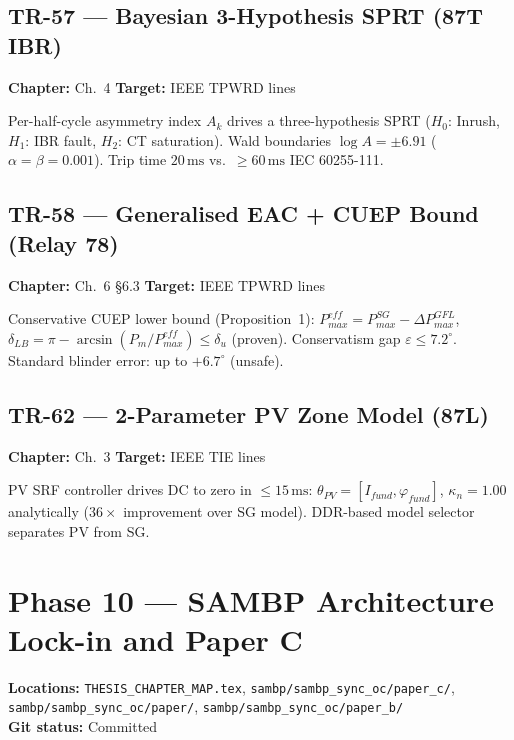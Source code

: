 \documentclass[11pt,a4paper]{article}
\begin{document}
\subsection{TR-57 — Bayesian 3-Hypothesis SPRT (87T IBR)}
\textbf{Chapter:} Ch.\ 4 \quad \textbf{Target:} IEEE TPWRD  lines

Per-half-cycle asymmetry index $A_k$ drives a three-hypothesis SPRT
($H_0$: Inrush, $H_1$: IBR fault, $H_2$: CT saturation).
Wald boundaries $\log A = \pm 6.91$ ($\alpha = \beta = 0.001$).
Trip time $20\,\mathrm{ms}$ vs.\ $\geq 60\,\mathrm{ms}$ IEC 60255-111.

\subsection{TR-58 — Generalised EAC + CUEP Bound (Relay 78)}
\textbf{Chapter:} Ch.\ 6 \S6.3 \quad \textbf{Target:} IEEE TPWRD  lines

Conservative CUEP lower bound (Proposition~1):
$P_{max}^{eff} = P_{max}^{SG} - \Delta P_{max}^{GFL}$,
$\delta_{LB} = \pi - \arcsin(P_m/P_{max}^{eff}) \leq \delta_u$ (proven).
Conservatism gap $\varepsilon \leq 7.2^\circ$. Standard blinder error:
up to $+6.7^\circ$ (unsafe).

\subsection{TR-62 — 2-Parameter PV Zone Model (87L)}
\textbf{Chapter:} Ch.\ 3 \quad \textbf{Target:} IEEE TIE  lines

PV SRF controller drives DC to zero in $\leq 15\,\mathrm{ms}$:
$\theta_{PV} = [I_{fund}, \varphi_{fund}]$,
$\kappa_n = 1.00$ analytically ($36\times$ improvement over SG model).
DDR-based model selector separates PV from SG.

\section{Phase 10 — SAMBP Architecture Lock-in and Paper C}

\begin{phasebox}
\textbf{Locations:} \texttt{THESIS\_CHAPTER\_MAP.tex},
\texttt{sambp/sambp\_sync\_oc/paper\_c/},
\texttt{sambp/sambp\_sync\_oc/paper/},
\texttt{sambp/sambp\_sync\_oc/paper\_b/}\\
\textbf{Git status:} Committed
\end{phasebox}
\end{document}
